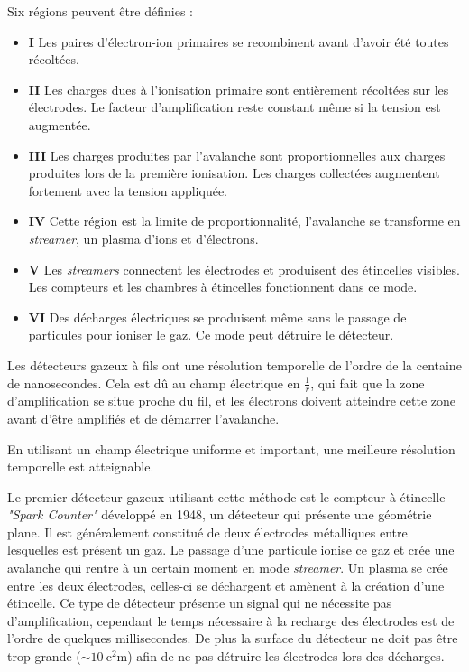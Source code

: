 Six régions peuvent être définies :

\begin{itemize}
	\item \textbf{I} Les paires d'électron-ion primaires se recombinent avant d'avoir été toutes récoltées.
	\item \textbf{II} Les charges dues à l'ionisation primaire sont entièrement récoltées sur les électrodes. Le facteur d'amplification reste constant même si la tension est augmentée.
	\item \textbf{III} Les charges produites par l'avalanche sont proportionnelles aux charges produites lors de la première ionisation. Les charges collectées augmentent fortement avec la tension appliquée.
	\item \textbf{IV} Cette région est la limite de proportionnalité, l'avalanche se transforme en \textit{streamer}, un plasma d'ions et d'électrons.
	\item \textbf{V} Les \textit{streamers} connectent les électrodes et produisent des étincelles visibles. Les compteurs  et les chambres à étincelles fonctionnent dans ce mode.
	\item \textbf{VI} Des décharges électriques se produisent même sans le passage de particules pour ioniser le gaz. Ce mode peut détruire le détecteur.
\end{itemize}
\newpage
Les détecteurs gazeux à fils ont une résolution temporelle de l'ordre de la centaine de nanosecondes. Cela est dû au champ électrique en $\frac{1}{r}$, qui fait que la zone d'amplification se situe proche du fil, et les électrons doivent atteindre cette zone avant d'être amplifiés et de démarrer l'avalanche.

En utilisant un champ électrique uniforme et important, une meilleure résolution temporelle est atteignable.

Le premier détecteur gazeux utilisant cette méthode est le compteur à étincelle \textit{"Spark Counter"} développé en \num{1948}, un détecteur qui présente une géométrie plane. Il est généralement constitué de deux électrodes métalliques entre lesquelles est présent un gaz. Le passage d'une particule ionise ce gaz et crée une avalanche qui rentre à un certain moment en mode \textit{streamer}. Un plasma se crée entre les deux électrodes, celles-ci se déchargent et amènent à la création d'une étincelle. Ce type de détecteur présente un signal qui ne nécessite pas d'amplification, cependant le temps nécessaire à la recharge des électrodes est de l'ordre de quelques millisecondes. De plus la surface du détecteur ne doit pas être trop grande ($\sim\SI{10}{\square\centi\meter}$) afin de ne pas détruire les électrodes lors des décharges.

